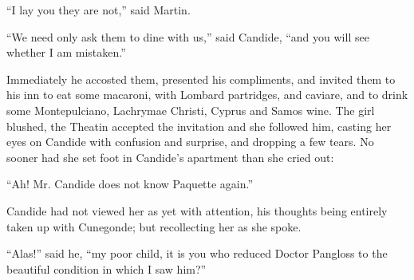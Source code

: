 ``I lay you they are not,'' said Martin.

``We need only ask them to dine with us,'' said Candide, ``and you will see whether I am mistaken.''

Immediately he accosted them, presented his compliments, and invited them to his inn to eat some macaroni, with Lombard partridges, and caviare, and to drink some Montepulciano, Lachrymae Christi, Cyprus and Samos wine. The girl blushed, the Theatin accepted the invitation and she followed him, casting her eyes on Candide with confusion and surprise, and dropping a few tears. No sooner had she set foot in Candide's apartment than she cried out:

``Ah! Mr. Candide does not know Paquette again.''

Candide had not viewed her as yet with attention, his thoughts being entirely taken up with Cunegonde; but recollecting her as she spoke.

``Alas!'' said he, ``my poor child, it is you who reduced Doctor Pangloss to the beautiful condition in which I saw him?''

